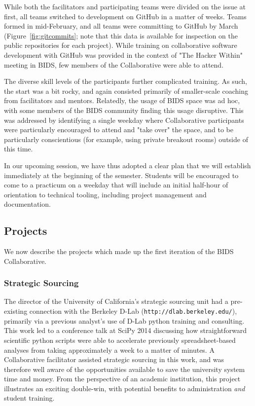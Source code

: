 \documentclass{sig-alternate}
\begin{document}
While both the facilitators and participating teams were divided on the issue at first, all teams switched to development on GitHub in a matter of weeks. Teams formed in mid-February, and all teams were committing to GitHub by March (Figure~\ref{fig:gitcommits}; note that this data is available for inspection on the public repositories for each project). While training on collaborative software development with GitHub was provided in the context of "The Hacker Within" meeting in BIDS, few members of the Collaborative were able to attend.

The diverse skill levels of the participants further complicated training. As such, the start was a bit rocky, and again consisted primarily of smaller-scale coaching from facilitators and mentors. Relatedly, the usage of BIDS space was ad hoc, with some members of the BIDS community finding this usage disruptive. This was addressed by identifying a single weekday where Collaborative participants were particularly encouraged to attend and "take over" the space, and to be particularly conscientious (for example, using private breakout rooms) outside of this time.

In our upcoming session, we have thus adopted a clear plan that we will establish immediately at the beginning of the semester. Students will be encouraged to come to a practicum on a weekday that will include an initial half-hour of orientation to technical tooling, including project management and documentation.

\subsection{Projects} \label{sec:projects}

We now describe the projects which made up the first iteration of the BIDS Collaborative.

\subsubsection*{Strategic Sourcing}

The director of the University of California's strategic sourcing unit had a pre-existing connection with the Berkeley D-Lab (\texttt{http://dlab.berkeley.edu/}), primarily via a previous analyst's use of D-Lab python training and consulting. This work led to a conference talk at SciPy 2014 discussing how straightforward scientific python scripts were able to accelerate previously spreadsheet-based analyses from taking approximately a week to a matter of minutes. A Collaborative facilitator assisted strategic sourcing in this work, and was therefore well aware of the opportunities available to save the university system time and money. From the perspective of an academic institution, this project illustrates an exciting double-win, with potential benefits to administration \emph{and} student training. 
\end{document}

